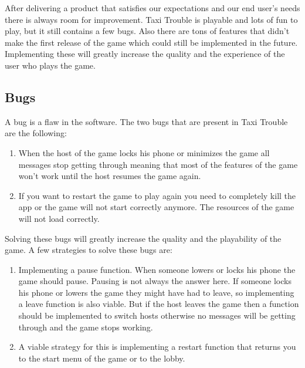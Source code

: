 After delivering a product that satisfies our expectations and our end user's needs there is always room for improvement. Taxi Trouble is playable and lots of fun to play, but it still contains a few bugs. Also there are tons of features that didn't make the first release of the game which could still be implemented in the future. Implementing these will greatly increase the quality and the experience of the user who plays the game.\\

\subsection*{Bugs}
A bug is a flaw in the software. The two bugs that are present in Taxi Trouble are the following:
\begin{enumerate}
\item When the host of the game locks his phone or minimizes the game all messages stop getting through meaning that most of the features of the game won't work until the host resumes the game again.
\item If you want to restart the game to play again you need to completely kill the app or the game will not start correctly anymore. The resources of the game will not load correctly.
\end{enumerate} 
Solving these bugs will greatly increase the quality and the playability of the game. A few strategies to solve these bugs are: 
\begin{enumerate}
\item Implementing a pause function. When someone lowers or locks his phone the game should pause. Pausing is not always the answer here. If someone locks his phone or lowers the game they might have had to leave, so implementing a leave function is also viable. But if the host leaves the game then a function should be implemented to switch hosts otherwise no messages will be getting through and the game stops working.
\item A viable strategy for this is implementing a restart function that returns you to the start menu of the game or to the lobby. 
\end{enumerate}

